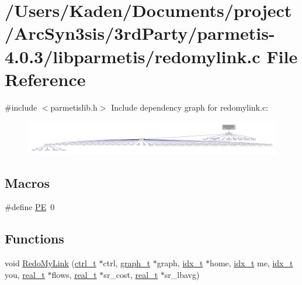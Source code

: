 \hypertarget{a00392}{}\section{/\+Users/\+Kaden/\+Documents/project/\+Arc\+Syn3sis/3rd\+Party/parmetis-\/4.0.3/libparmetis/redomylink.c File Reference}
\label{a00392}
{\ttfamily \#include $<$parmetislib.\+h$>$}\newline
Include dependency graph for redomylink.\+c\+:\nopagebreak
\begin{figure}[H]
\begin{center}
\leavevmode
\includegraphics[width=350pt]{a00393}
\end{center}
\end{figure}
\subsection*{Macros}
\begin{DoxyCompactItemize}
\item 
\#define \hyperlink{a00392_a211238ffe3627f42ca7b04bc96cc8fa6}{PE}~0
\end{DoxyCompactItemize}
\subsection*{Functions}
\begin{DoxyCompactItemize}
\item 
void \hyperlink{a00392_a33598690c13a8a70b245a84d07631bfb}{Redo\+My\+Link} (\hyperlink{a00742}{ctrl\+\_\+t} $\ast$ctrl, \hyperlink{a00734}{graph\+\_\+t} $\ast$graph, \hyperlink{a00876_aaa5262be3e700770163401acb0150f52}{idx\+\_\+t} $\ast$home, \hyperlink{a00876_aaa5262be3e700770163401acb0150f52}{idx\+\_\+t} me, \hyperlink{a00876_aaa5262be3e700770163401acb0150f52}{idx\+\_\+t} you, \hyperlink{a00876_a1924a4f6907cc3833213aba1f07fcbe9}{real\+\_\+t} $\ast$flows, \hyperlink{a00876_a1924a4f6907cc3833213aba1f07fcbe9}{real\+\_\+t} $\ast$sr\+\_\+cost, \hyperlink{a00876_a1924a4f6907cc3833213aba1f07fcbe9}{real\+\_\+t} $\ast$sr\+\_\+lbavg)
\end{DoxyCompactItemize}


